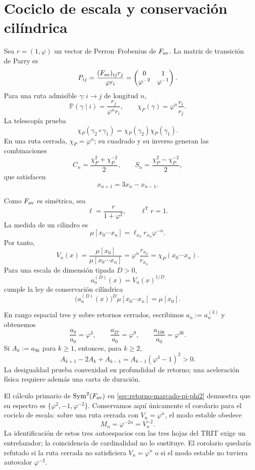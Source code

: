 \section{Cociclo de escala y conservación cilíndrica}
\label{sec:cociclo-parry-escala}

Sea \(r=(1,\varphi)\) un vector de Perron--Frobenius de
\(F_{\rm av}\). La matriz de transición de Parry es
\[
P_{ij}=\frac{(F_{\rm av})_{ij}r_j}{\varphi r_i}
=
\begin{pmatrix}
0&1\\
\varphi^{-2}&\varphi^{-1}
\end{pmatrix}.
\]
Para una ruta admisible \(\gamma:i\to j\) de longitud \(n\),
\[
\mathbb P(\gamma\mid i)=\frac{r_j}{\varphi^nr_i},
\qquad
\boxed{\chi_P(\gamma)=\varphi^n\frac{r_i}{r_j}.}
\]
La telescopía prueba
\[
\chi_P(\gamma_2\circ\gamma_1)
=\chi_P(\gamma_2)\chi_P(\gamma_1).
\]
En una ruta cerrada, \(\chi_P=\varphi^n\); su cuadrado y su inverso
generan las combinaciones
\[
C_n=\frac{\chi_P^2+\chi_P^{-2}}2,\qquad
S_n=\frac{\chi_P^2-\chi_P^{-2}}2,
\]
que satisfacen
\[
x_{n+1}=3x_n-x_{n-1}.
\]

Como \(F_{\rm av}\) es simétrica, sea
\[
\ell=\frac{r}{1+\varphi^2},\qquad \ell^{\mathsf T}r=1.
\]
La medida de un cilindro es
\[
\mu[x_0\cdots x_n]=\ell_{x_0}r_{x_n}\varphi^{-n}.
\]
Por tanto,
\[
\boxed{
V_n(x)
=\frac{\mu[x_0]}{\mu[x_0\cdots x_n]}
=\varphi^n\frac{r_{x_0}}{r_{x_n}}
=\chi_P(x_0\cdots x_n).}
\]
Para una escala de dimensión tipada \(D>0\),
\[
a_n^{(D)}(x)=V_n(x)^{1/D}
\]
cumple la ley de conservación cilíndrica
\[
\boxed{
\bigl(a_n^{(D)}(x)\bigr)^D
\mu[x_0\cdots x_n]=\mu[x_0].}
\]

En rango espacial tres y sobre retornos cerrados, escribimos
\(a_n:=a_n^{(3)}\) y obtenemos
\[
\boxed{
\frac{a_9}{a_0}=\varphi^3,\qquad
\frac{a_{27}}{a_0}=\varphi^9,\qquad
\frac{a_{108}}{a_0}=\varphi^{36}.}
\]
Si \(A_k:=a_{9k}\) para \(k\geq1\), entonces, para \(k\geq2\),
\[
A_{k+1}-2A_k+A_{k-1}
=A_{k-1}(\varphi^3-1)^2>0.
\]
La desigualdad prueba convexidad en profundidad de retorno; una aceleración
física requiere además una carta de duración.

El cálculo primario de
\(\operatorname{Sym}^2(F_{\rm av})\) en
\cref{sec:retorno-marcado-pi-phi2} demuestra que su espectro es
\(\{\varphi^2,-1,\varphi^{-2}\}\). Conservamos aquí únicamente el corolario
para el cociclo de escala: sobre una ruta cerrada con \(V_n=\varphi^n\), el
modo estable obedece
\[
\boxed{M_n=\varphi^{-2n}=V_n^{-2}.}
\]
La identificación de estos tres autoespacios con las tres hojas del TRIT
exige un entrelazador; la coincidencia de cardinalidad no lo sustituye. El
corolario quedaría refutado si la ruta cerrada no satisficiera
\(V_n=\varphi^n\) o si el modo estable no tuviera autovalor
\(\varphi^{-2}\).

